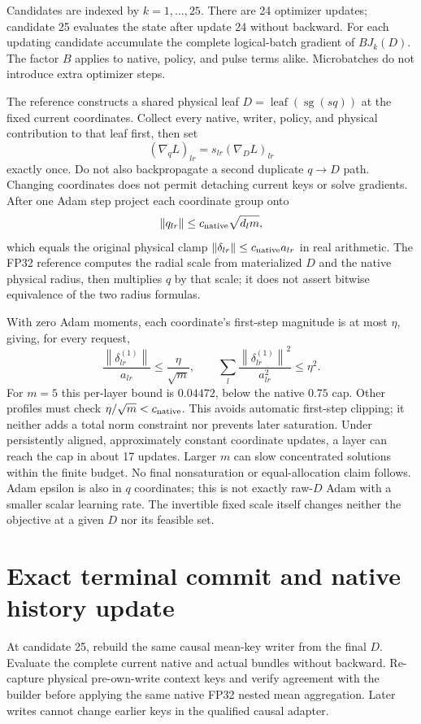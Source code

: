 \documentclass[10pt]{article}
\newcommand{\sg}{\operatorname{sg}}
\newcommand{\norm}[1]{\left\lVert#1\right\rVert}
\begin{document}
Candidates are indexed by $k=1,\ldots,25$. There are 24 optimizer
updates; candidate 25 evaluates the state after update 24 without backward. For each updating
candidate accumulate the complete logical-batch gradient of $B J_k(D)$.
The factor $B$ applies to native, policy, and pulse terms alike.
Microbatches do not introduce extra optimizer steps.

The reference constructs a shared physical leaf
$D=\operatorname{leaf}(\sg(sq))$ at the fixed current coordinates.
Collect every native, writer, policy, and physical contribution to that
leaf first, then set
\[
 (\nabla_q L)_{lr}=s_{lr}(\nabla_D L)_{lr}
\]
exactly once. Do not also backpropagate a second duplicate $q\to D$
path. Changing coordinates does not permit detaching current keys or
solve gradients. After one Adam step project each coordinate group onto
\[
 \norm{q_{lr}}\leq c_{\rm native}\sqrt{d_lm},
\]
which equals the original physical clamp
$\norm{\delta_{lr}}\leq c_{\rm native}a_{lr}$ in real arithmetic.
The FP32 reference computes the radial scale from materialized $D$
and the native physical radius, then multiplies $q$ by that scale;
it does not assert bitwise equivalence of the two radius formulas.

With zero Adam moments, each coordinate's first-step magnitude is at
most $\eta$, giving, for every request,
\[
 \frac{\norm{\delta_{lr}^{(1)}}}{a_{lr}}\leq\frac{\eta}{\sqrt m},
 \qquad
 \sum_l\frac{\norm{\delta_{lr}^{(1)}}^2}{a_{lr}^2}\leq\eta^2.
\]
For $m=5$ this per-layer bound is $0.04472$, below the native $0.75$
cap. Other profiles must check $\eta/\sqrt m<c_{\rm native}$. This
avoids automatic first-step clipping; it neither adds a total
norm constraint nor prevents later saturation. Under persistently aligned,
approximately constant coordinate updates, a layer can reach the cap in
about 17 updates. Larger $m$ can slow concentrated solutions within the
finite budget. No final nonsaturation or equal-allocation claim follows.
Adam epsilon is also in $q$ coordinates; this is not exactly raw-$D$
Adam with a smaller scalar learning rate. The invertible fixed scale
itself changes neither the objective at a given $D$ nor its feasible set.

\newpage
\section{Exact terminal commit and native history update}
At candidate 25, rebuild the same causal mean-key writer from the final
$D$. Evaluate the complete current native and actual bundles without
backward. Re-capture physical pre-own-write context keys and verify
agreement with the builder before applying the same native FP32 nested
mean aggregation. Later writes cannot change earlier keys in the
qualified causal adapter.
\end{document}

